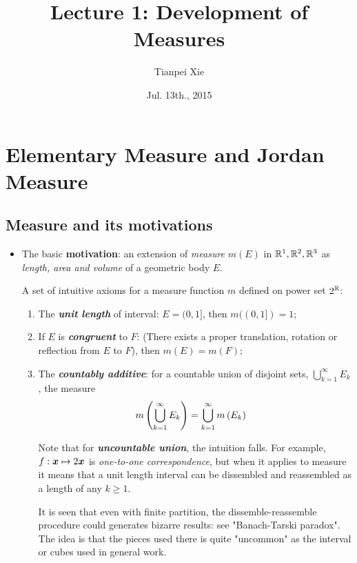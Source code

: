 \documentclass[11pt]{article}
\begin{document}
\title{Lecture 1: Development of Measures}
\author{ Tianpei Xie}
\date{ Jul. 13th., 2015 }
\maketitle
\tableofcontents
\newpage
\section{Elementary Measure and Jordan Measure}
\subsection{Measure and its motivations}
\begin{itemize}
\item \begin{remark} 
The basic \textbf{motivation}: an extension of  \emph{measure} $m(E)$ in ${\mathbb R}^{1}, {\mathbb R}^{2}, {\mathbb R}^{3}$ as \emph{length, area and volume} of a geometric body $E$. 

\citep{tao2011introduction} A set of intuitive axioms for a measure function $m$ defined on power set $2^{{\mathbb R}}$: 
\begin{enumerate}
\item The \emph{\textbf{unit length}} of interval: $E= (0,1]$, then $m((0,1]) = 1$;
\item If $E$ is \emph{\textbf{congruent}} to $F$: (There exists a proper translation, rotation or reflection from $E$ to $F$), then $m(E) = m(F)$;
\item The \emph{\textbf{countably additive}}: for a countable union of disjoint sets, $\bigcup_{k=1}^{\infty}E_{k}$, the measure 
\begin{align*}
m\left(\bigcup_{k=1}^{\infty}E_{k}\right) &= \bigcup_{k=1}^{\infty}m\left(E_{k}\right)
\end{align*}  

Note that for \emph{\textbf{uncountable union}}, the intuition falls. For example, $f: \boldsymbol{x} \mapsto 2\boldsymbol{x}$ is \emph{one-to-one correspondence}, but when it applies to measure it means that a unit length interval can be dissembled and reassembled as a length of any $k\ge 1$. 

It is seen that even with finite partition, the dissemble-reassemble procedure could generates bizarre results: see "Banach-Tarski paradox". \citep{tao2011introduction} The idea is that the pieces used there is quite "uncommon" as the interval or cubes used in general work. 
\end{enumerate}
\end{remark}


\end{itemize}
\end{document}
